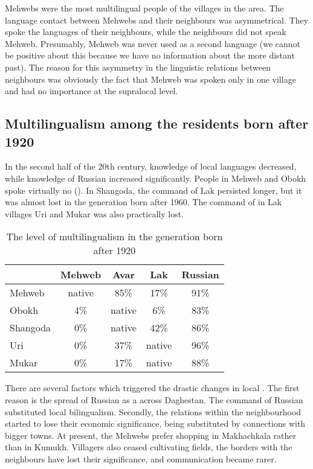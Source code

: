 \documentclass[output=paper]{langsci/langscibook}
\begin{document}
Mehwebs were the most multilingual people of the villages in the area.
The language contact between Mehwebs and their neighbours was
asymmetrical. They spoke the languages of their neighbours, while the
neighbours did not speak Mehweb. Presumably, Mehweb was never used as a
second language (we cannot be positive about this because we have no information
about the more distant past). The reason for this asymmetry in the
linguistic relations between neighbours was obviously the fact that
Mehweb was spoken only in one village and had no importance at the
supralocal level.


\subsection{Multilingualism among the residents born after
1920}\label{multilingualism-among-the-residents-born-after-1920}

In the second half of the 20th century, knowledge of local languages
decreased, while knowledge of Russian increased significantly. People in
Mehweb and Obokh spoke virtually no  (). In Shangoda, the
command of Lak persisted longer, but it was almost lost in the
generation born after 1960. The command of  in Lak villages Uri and
Mukar was also practically lost.

\begin{table}[ht]
\begin{tabular}{@{}lcccc@{}}
\toprule
& {Mehweb} & {Avar} & {Lak} & {Russian}\tabularnewline \midrule
{Mehweb} & native & 85\% & 17\% & 91\%\tabularnewline
{Obokh} & 4\% & native & 6\% & 83\%\tabularnewline
{Shangoda} & 0\% & native & 42\% & 86\%\tabularnewline
{Uri} & 0\% & 37\% & native & 96\%\tabularnewline
{Mukar} & 0\% & 17\% & native & 88\%\tabularnewline
\bottomrule
\end{tabular}

\caption{The level of multilingualism in the generation born after 1920}
\label{Table3}
\end{table}

There are several factors which triggered the drastic changes in local
. The first reason is the spread of Russian as a 
across Daghestan. The command of Russian substituted local bilingualism.
Secondly, the relations within the neighbourhood started to lose their
economic significance, being substituted by connections with bigger
towns. At present, the Mehwebs prefer shopping in Makhachkala rather
than in Kumukh. Villagers also ceased cultivating fields, the borders
with the neighbours have lost their significance, and communication
became rarer.
\end{document}
